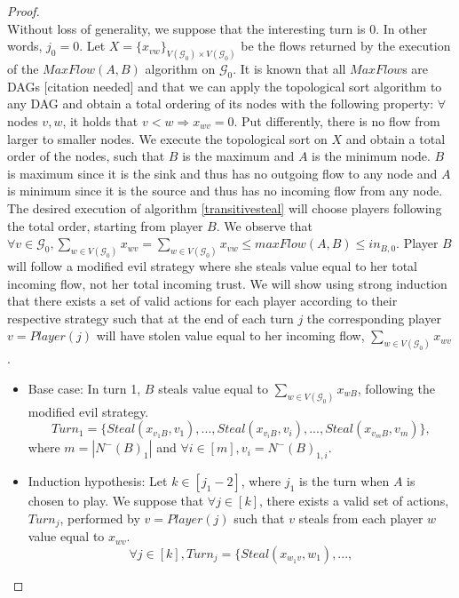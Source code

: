 \documentclass[11pt]{article}
\theoremstyle{definition}
\theoremstyle{corollary}
\theoremstyle{lemma}
\begin{document}
    \begin{proof} \ \\
       Without loss of generality, we suppose that the interesting turn is 0. In other words, $j_0 = 0$. Let $X =
       \{x_{vw}\}_{V(\mathcal{G}_0) \times V(\mathcal{G}_0)}$ be the flows returned by the execution of the $MaxFlow(A, B)$
       algorithm on $\mathcal{G}_0$. It is known that all $MaxFlow$s are DAGs [citation needed] and that we can apply the
       topological sort algorithm to any DAG and obtain a total ordering of its nodes with the following property: $\forall$
       nodes $v, w$, it holds that $v < w \Rightarrow x_{wv} = 0$. Put differently, there is no flow from larger to smaller
       nodes. We execute the topological sort on $X$ and obtain a total order of the nodes, such that $B$ is the maximum and
       $A$ is the minimum node. $B$ is maximum since it is the sink and thus has no outgoing flow to any node and $A$ is
       minimum since it is the source and thus has no incoming flow from any node. The desired execution of algorithm
       \ref{transitivesteal} will choose players following the total order, starting from player $B$. We observe that
       $\forall v \in \mathcal{G}_0, \sum\limits_{w \in V(\mathcal{G}_0)}x_{wv} = \sum\limits_{w \in V(\mathcal{G}_0)}x_{vw}
       \leq maxFlow(A, B) \leq in_{B, 0}$. Player $B$ will follow a modified evil strategy where she steals value equal to
       her total incoming flow, not her total incoming trust. We will show using strong induction that there exists a set of
       valid actions for each player according to their respective strategy such that at the end of each turn $j$ the
       corresponding player $v = Player(j)$ will have stolen value equal to her incoming flow,
       $\sum\limits_{w \in V(\mathcal{G}_0)}x_{wv}$.
       \begin{itemize}
          \item Base case: In turn 1, $B$ steals value equal to $\sum\limits_{w \in V(\mathcal{G}_0)}x_{wB}$, following the
          modified evil strategy. $$Turn_1 = \{Steal(x_{v_1B}, v_1), ..., Steal(x_{v_iB}, v_i), ...,Steal(x_{v_mB},
          v_m)\},$$ where $m = |N^{-}(B)_1|$ and $\forall i \in [m], v_i = N^{-}(B)_{1, i}$.
          \item Induction hypothesis: Let $k \in [j_1 - 2]$, where $j_1$ is the turn when $A$ is chosen to play. We suppose
          that $\forall j \in [k]$, there exists a valid set of actions, $Turn_j$, performed by $v = Player(j)$ such that $v$
          steals from each player $w$ value equal to $x_{wv}$. $$\forall j \in [k], Turn_j = \{Steal(x_{w_1v}, w_1), ...,
$$
\end{itemize}
\end{proof}
\end{document}

